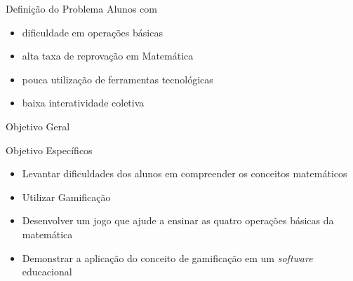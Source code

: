 \documentclass[13pt,xcolor=table]{beamer}
\begin{document}

\begin{frame} %
	\cabecalho
\end{frame}



\begin{frame}
	\begin{lamina}{Definição do Problema}
		Alunos com
		\begin{itemize}
			\item dificuldade em operações básicas
			\item alta taxa de reprovação em Matemática
			\item pouca utilização de ferramentas tecnológicas
			\item baixa interatividade coletiva
		\end{itemize}
	\end{lamina}
\end{frame}


\begin{frame}
	\begin{lamina}{Objetivo Geral}
		\vspace{3em}
	\end{lamina}
\end{frame}


\begin{frame}
	\begin{lamina}{Objetivo Específicos}
		\begin{itemize}
			\item Levantar dificuldades dos alunos em compreender os conceitos matemáticos
			\item Utilizar Gamificação
			\item Desenvolver um jogo que ajude a ensinar as quatro operações básicas da matemática
			\item Demonstrar a aplicação do conceito de gamificação em um {\it software} educacional
		\end{itemize}
	\end{lamina}
\end{frame}
\end{document}
